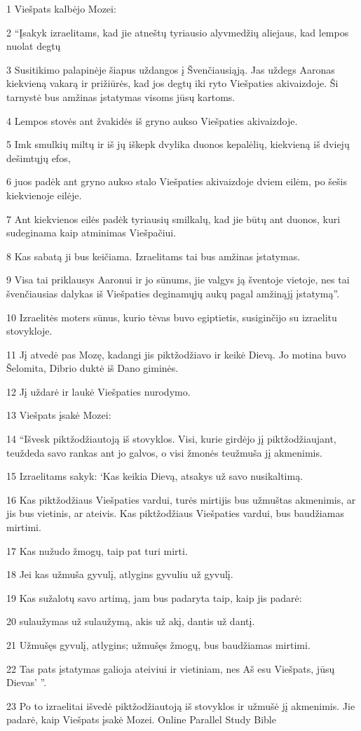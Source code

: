\par 1 Viešpats kalbėjo Mozei: 
\par 2 “Įsakyk izraelitams, kad jie atneštų tyriausio alyvmedžių aliejaus, kad lempos nuolat degtų 
\par 3 Susitikimo palapinėje šiapus uždangos į Švenčiausiąją. Jas uždegs Aaronas kiekvieną vakarą ir prižiūrės, kad jos degtų iki ryto Viešpaties akivaizdoje. Ši tarnystė bus amžinas įstatymas visoms jūsų kartoms. 
\par 4 Lempos stovės ant žvakidės iš gryno aukso Viešpaties akivaizdoje. 
\par 5 Imk smulkių miltų ir iš jų iškepk dvylika duonos kepalėlių, kiekvieną iš dviejų dešimtųjų efos, 
\par 6 juos padėk ant gryno aukso stalo Viešpaties akivaizdoje dviem eilėm, po šešis kiekvienoje eilėje. 
\par 7 Ant kiekvienos eilės padėk tyriausių smilkalų, kad jie būtų ant duonos, kuri sudeginama kaip atminimas Viešpačiui. 
\par 8 Kas sabatą ji bus keičiama. Izraelitams tai bus amžinas įstatymas. 
\par 9 Visa tai priklausys Aaronui ir jo sūnums, jie valgys ją šventoje vietoje, nes tai švenčiausias dalykas iš Viešpaties deginamųjų aukų pagal amžinąjį įstatymą”. 
\par 10 Izraelitės moters sūnus, kurio tėvas buvo egiptietis, susiginčijo su izraelitu stovykloje. 
\par 11 Jį atvedė pas Mozę, kadangi jis piktžodžiavo ir keikė Dievą. Jo motina buvo Šelomita, Dibrio duktė iš Dano giminės. 
\par 12 Jį uždarė ir laukė Viešpaties nurodymo. 
\par 13 Viešpats įsakė Mozei: 
\par 14 “Išvesk piktžodžiautoją iš stovyklos. Visi, kurie girdėjo jį piktžodžiaujant, teuždeda savo rankas ant jo galvos, o visi žmonės teužmuša jį akmenimis. 
\par 15 Izraelitams sakyk: ‘Kas keikia Dievą, atsakys už savo nusikaltimą. 
\par 16 Kas piktžodžiaus Viešpaties vardui, turės mirti­jis bus užmuštas akmenimis, ar jis bus vietinis, ar ateivis. Kas piktžodžiaus Viešpaties vardui, bus baudžiamas mirtimi. 
\par 17 Kas nužudo žmogų, taip pat turi mirti. 
\par 18 Jei kas užmuša gyvulį, atlygins gyvuliu už gyvulį. 
\par 19 Kas sužalotų savo artimą, jam bus padaryta taip, kaip jis padarė: 
\par 20 sulaužymas už sulaužymą, akis už akį, dantis už dantį. 
\par 21 Užmušęs gyvulį, atlygins; užmušęs žmogų, bus baudžiamas mirtimi. 
\par 22 Tas pats įstatymas galioja ateiviui ir vietiniam, nes Aš esu Viešpats, jūsų Dievas’ ”. 
\par 23 Po to izraelitai išvedė piktžodžiautoją iš stovyklos ir užmušė jį akmenimis. Jie padarė, kaip Viešpats įsakė Mozei.
Online Parallel Study Bible



